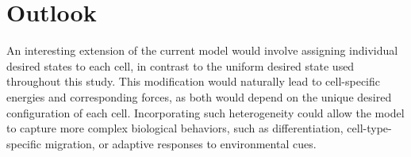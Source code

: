 \section{Outlook}

An interesting extension of the current model would involve assigning individual desired states to each cell, in contrast to the uniform desired state used throughout this study. 
This modification would naturally lead to cell-specific energies and corresponding forces, as both would depend on the unique desired configuration of each cell. 
Incorporating such heterogeneity could allow the model to capture more complex biological behaviors, such as differentiation, cell-type-specific migration, or adaptive responses to environmental cues. 
